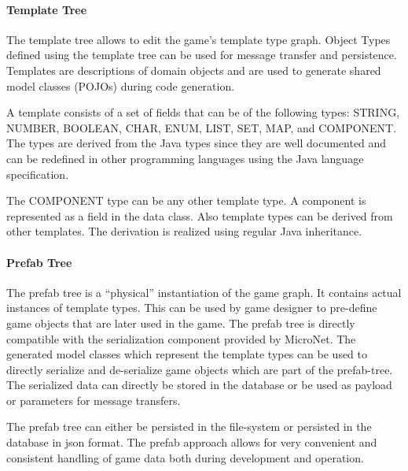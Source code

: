 \paragraph{Template Tree}

The template tree allows to edit the game's template type graph. Object Types
defined using the template tree can be used for message transfer and
persistence. Templates are descriptions of domain objects and are used to
generate shared model classes (POJOs) during code generation.

A template consists of a set of fields that can be of the following types:
STRING, NUMBER, BOOLEAN, CHAR, ENUM, LIST, SET, MAP, and COMPONENT. The types
are derived from the Java types since they are well documented and can be
redefined in other programming languages using the Java language specification.

The COMPONENT type can be any other template type. A component is represented as
a field in the data class. Also template types can be derived from
other templates. The derivation is realized using regular Java inheritance.


\paragraph{Prefab Tree}

The prefab tree is a ``physical'' instantiation of the game graph. It contains
actual instances of template types. This can be used by game designer to
pre-define game objects that are later used in the game. The prefab tree is
directly compatible with the serialization component provided by MicroNet. The
generated model classes which represent the template types can be used to
directly serialize and de-serialize game objects which are part of the
prefab-tree. The serialized data can directly be stored in the database or
be used as payload or parameters for message transfers.

The prefab tree can either be persisted in the file-system or persisted in the
database in \gls{json} format. The prefab approach allows for very convenient and
consistent handling of game data both during development and operation.


